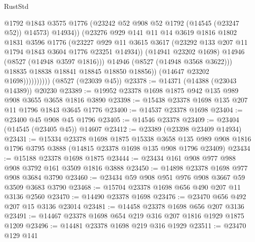 \begin{lexlean}{RustStd}
\begin{coremodule}
                                @1792
                                @1843
                                @3575
                                @1776
                                (@23242 @52 @908 @52 @1792 (@14545 (@23247 @52)) @14573)
                                @14934))
                            (@23276
                              @929
                              @141
                              @11
                              @14
                              @3619
                              @1816
                              @1802
                              @1831
                              @3596
                              @1776
                              (@23227
                                @929
                                @11
                                @3615
                                @3617
                                (@23292 @133 @207 @11 @1794 @1843 @3604 @1776 @23251 @14934))
                              (@14941 @23202 @1698)
                              @14946
                              (@8527 (@14948 @3597 @1816)))
                            @14946
                            (@8527 (@14948 @3568 @3622)))
                          @18835
                          @18838
                          @18841
                          @18845
                          @18850
                          @18856))
                      (@14647 @23202 @1698))))))))))
    (@8527 (@23039 @45))
@23378 := @14371 (@14388 (@23043 @14389)) @20230
@23389 := @19952 @23378 @1698 @1875 @942 @135 @989 @908 @3655 @3658 @1816 @3890
@23398 := @15438 @23378 @1698 @135 @207 @11 @1796 @1843 @3645 @1776
@23400 := @14537 @23378 @1698
@23404 := @23400 @45 @908 @45 @1796
@23405 := @14546 @23378
@23409 := @23404 (@14545 (@23405 @45)) @14607
@23412 := @23389 (@23398 @23409 @14934)
@23431 := @15334
    @23378
    @1698
    @1875
    @15338
    @3658
    @135
    @989
    @908
    @1816
    @1796
    @3795
    @3888
    (@14815 @23378 @1698 @135 @908 @1796 @23409)
@23434 := @15188 @23378 @1698 @1875
@23444 := @23434 @161 @908 @977 @988 @908 @3792 @161 @3509 @1816 @3888
@23450 := @14898 @23378 @1698 @977 @908 @3684 @3790
@23460 := @23434 @59 @908 @951 @976 @908 @3667 @59 @3509 @3683 @3790
@23468 := @15704 @23378 @1698 @656 @490 @207 @11 @3136 @2560
@23470 := @14490 @23378 @1698
@23476 := @23470 @656 @492 @207 @15 @3136 @23014
@23481 := @14458 @23378 @1698 @656 @207 @3136
@23491 := @14467 @23378 @1698 @654 @219 @316 @207 @1816 @1929 @1875 @1209
@23496 := @14481 @23378 @1698 @219 @316 @1929
@23511 := @23470
    @129
    @141

\end{coremodule}
\end{lexlean}
